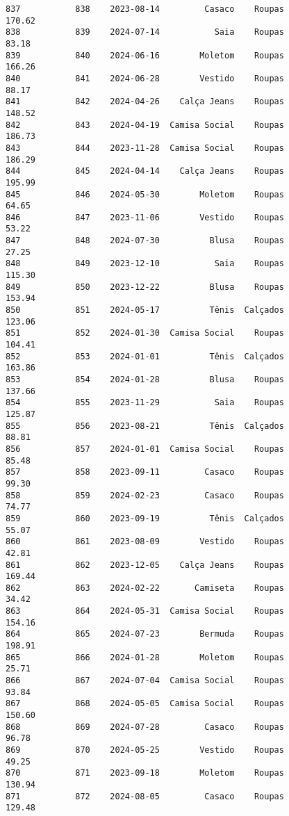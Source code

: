 \documentclass[11pt]{article}
\begin{document}
\begin{Verbatim}[commandchars=\\\{\}]
837           838    2023-08-14         Casaco    Roupas          170.62   
838           839    2024-07-14           Saia    Roupas           83.18   
839           840    2024-06-16        Moletom    Roupas          166.26   
840           841    2024-06-28        Vestido    Roupas           88.17   
841           842    2024-04-26    Calça Jeans    Roupas          148.52   
842           843    2024-04-19  Camisa Social    Roupas          186.73   
843           844    2023-11-28  Camisa Social    Roupas          186.29   
844           845    2024-04-14    Calça Jeans    Roupas          195.99   
845           846    2024-05-30        Moletom    Roupas           64.65   
846           847    2023-11-06        Vestido    Roupas           53.22   
847           848    2024-07-30          Blusa    Roupas           27.25   
848           849    2023-12-10           Saia    Roupas          115.30   
849           850    2023-12-22          Blusa    Roupas          153.94   
850           851    2024-05-17          Tênis  Calçados          123.06   
851           852    2024-01-30  Camisa Social    Roupas          104.41   
852           853    2024-01-01          Tênis  Calçados          163.86   
853           854    2024-01-28          Blusa    Roupas          137.66   
854           855    2023-11-29           Saia    Roupas          125.87   
855           856    2023-08-21          Tênis  Calçados           88.81   
856           857    2024-01-01  Camisa Social    Roupas           85.48   
857           858    2023-09-11         Casaco    Roupas           99.30   
858           859    2024-02-23         Casaco    Roupas           74.77   
859           860    2023-09-19          Tênis  Calçados           55.07   
860           861    2023-08-09        Vestido    Roupas           42.81   
861           862    2023-12-05    Calça Jeans    Roupas          169.44   
862           863    2024-02-22       Camiseta    Roupas           34.42   
863           864    2024-05-31  Camisa Social    Roupas          154.16   
864           865    2024-07-23        Bermuda    Roupas          198.91   
865           866    2024-01-28        Moletom    Roupas           25.71   
866           867    2024-07-04  Camisa Social    Roupas           93.84   
867           868    2024-05-05  Camisa Social    Roupas          150.60   
868           869    2024-07-28         Casaco    Roupas           96.78   
869           870    2024-05-25        Vestido    Roupas           49.25   
870           871    2023-09-18        Moletom    Roupas          130.94   
871           872    2024-08-05         Casaco    Roupas          129.48   

\end{Verbatim}
\end{document}
